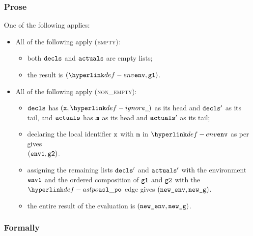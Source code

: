 \subsubsection{Prose}
One of the following applies:
\begin{itemize}
  \item All of the following apply (\textsc{empty}):
  \begin{itemize}
    \item both $\texttt{decls}$ and $\texttt{actuals}$ are empty lists;
    \item the result is $(\env, \vgone)$.
  \end{itemize}

  \item All of the following apply (\textsc{non\_empty}):
  \begin{itemize}
    \item $\texttt{decls}$ has $(\vx, \Ignore)$ as its head and $\texttt{decls}'$ as its tail,
    and $\texttt{actuals}$ has $\texttt{m}$ as its head and $\texttt{actuals}'$ as its tail;
    \item declaring the local identifier $\texttt{x}$ with $\texttt{m}$ in $\env$ as per 
    gives \\ $(\texttt{env1}, \texttt{g2})$.
    \item assigning the remaining lists $\texttt{decls}'$ and $\texttt{actuals}'$ with the environment $\texttt{env1}$ and the ordered
    composition of $\texttt{g1}$ and $\texttt{g2}$ with the $\aslpo$ edge gives $(\texttt{new\_env}, \texttt{new\_g})$.
    \item the entire result of the evaluation is $(\texttt{new\_env}, \texttt{new\_g})$.
  \end{itemize}
\end{itemize}

\subsubsection{Formally}

